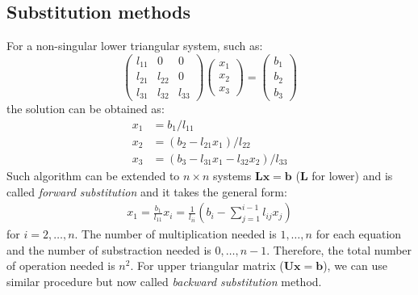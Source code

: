 \documentclass{article}
\begin{document}
\subsection{Substitution methods}
For a non-singular lower triangular system, such as:
\begin{equation}
    \left(\begin{matrix}
        l_{11} & 0 & 0 \\
        l_{21} & l_{22} & 0 \\
        l_{31} & l_{32} & l_{33} 
    \end{matrix}\right)
    \left(\begin{matrix}
        x_1 \\ x_2 \\ x_3
    \end{matrix}\right) = 
    \left(\begin{matrix}
        b_1 \\ b_2 \\ b_3
    \end{matrix}\right)
\end{equation}
the solution can be obtained as:
\begin{align*}
    x_1 &= b_1 / l_{11} \\
    x_2 &= (b_2 - l_{21} x_1 ) / l_{22} \\
    x_3 &= (b_3 - l_{31} x_1 - l_{32} x_2) / l_{33}
\end{align*}
Such algorithm can be extended to $n\times n$ systems 
$\mathbf{L}\mathbf{x} = \mathbf{b}$ ($\mathbf{L}$ for lower)
and is called \emph{forward substitution}
and it takes the general form:
\begin{align*}
    x_1 = \frac{b_1}{l_{11}}
    x_i = \frac{1}{l_{ii}} \left(b_i - \sum_{j = 1}^{i-1} l_{ij}x_j\right) 
\end{align*}
for $i = 2, \dots, n$. The number of multiplication needed is $1, \dots, n$ for each 
equation and the number of substraction needed is $0, \dots, n-1$. Therefore, the total 
number of operation needed is $n^2$. 
For upper triangular matrix ($\mathbf{U}\mathbf{x} = \mathbf{b}$), we can use similar procedure but now called 
\emph{backward substitution} method.
\end{document}
